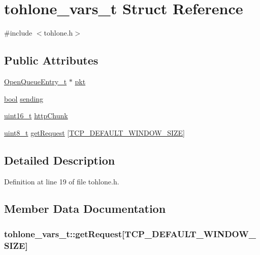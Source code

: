 \hypertarget{structtohlone__vars__t}{}\section{tohlone\+\_\+vars\+\_\+t Struct Reference}
\label{structtohlone__vars__t}


{\ttfamily \#include $<$tohlone.\+h$>$}

\subsection*{Public Attributes}
\begin{DoxyCompactItemize}
\item 
\hyperlink{struct_open_queue_entry__t}{Open\+Queue\+Entry\+\_\+t} $\ast$ \hyperlink{structtohlone__vars__t_a0457aaa5b4ea14a49fbc37052f159a35}{pkt}
\item 
\hyperlink{_p_e___types_8h_a97a80ca1602ebf2303258971a2c938e2}{bool} \hyperlink{structtohlone__vars__t_a25e888d77b871a5516b8758d9a6ac751}{sending}
\item 
\hyperlink{_p_e___types_8h_a1f1825b69244eb3ad2c7165ddc99c956}{uint16\+\_\+t} \hyperlink{structtohlone__vars__t_a37937ca3f79901a363a85d812f2e6443}{http\+Chunk}
\item 
\hyperlink{_p_e___types_8h_aba7bc1797add20fe3efdf37ced1182c5}{uint8\+\_\+t} \hyperlink{structtohlone__vars__t_a222b2e85dfedb2e13028b25be3a46939}{get\+Request} \mbox{[}\hyperlink{group___open_tcp_gga7966e5b85826cd528c3ccfd3e290e6daace8e99d135977712153ea54d99c9db89}{T\+C\+P\+\_\+\+D\+E\+F\+A\+U\+L\+T\+\_\+\+W\+I\+N\+D\+O\+W\+\_\+\+S\+I\+ZE}\mbox{]}
\end{DoxyCompactItemize}


\subsection{Detailed Description}


Definition at line 19 of file tohlone.\+h.



\subsection{Member Data Documentation}
\subsubsection[{\texorpdfstring{get\+Request}{getRequest}}]{ tohlone\+\_\+vars\+\_\+t\+::get\+Request\mbox{[}{\bf T\+C\+P\+\_\+\+D\+E\+F\+A\+U\+L\+T\+\_\+\+W\+I\+N\+D\+O\+W\+\_\+\+S\+I\+ZE}\mbox{]}}\hypertarget{structtohlone__vars__t_a222b2e85dfedb2e13028b25be3a46939}{}\label{structtohlone__vars__t_a222b2e85dfedb2e13028b25be3a46939}



